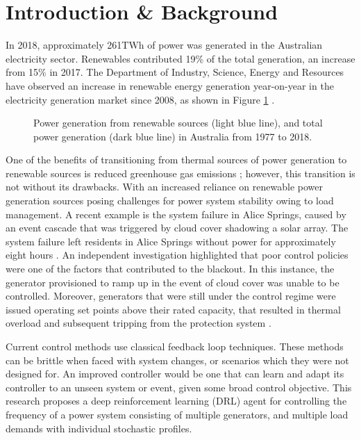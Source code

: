 \section{Introduction \& Background}
In 2018, approximately 261$\si{\tera\watt\hour}$ of power was generated in the Australian electricity sector. Renewables contributed 19\% of the total generation, an increase from 15\% in 2017. The Department of Industry, Science, Energy and Resources have observed an increase in renewable energy generation year-on-year in the electricity generation market since 2008, as shown in Figure \ref{fig:energyts} \cite{Diser2020}.
\begin{figure}[ht]
	\centering
	
	\caption{Power generation from renewable sources (light blue line), and total power generation (dark blue line) in Australia from 1977 to 2018.}
	\label{fig:energyts}
\end{figure}



One of the benefits of transitioning from thermal sources of power generation to renewable sources is reduced greenhouse gas emissions \cite{IPCC2012}; however, this transition is not without its drawbacks. With an increased reliance on renewable power generation sources posing challenges for power system stability owing to load management. A recent example is the system failure in Alice Springs, caused by an event cascade that was triggered by cloud cover shadowing a solar array. The system failure left residents in Alice Springs without power for approximately eight hours \cite{UCNT2019}. An independent investigation highlighted that poor control policies were one of the factors that contributed to the blackout. In this instance, the generator provisioned to ramp up in the event of cloud cover was unable to be controlled. Moreover, generators that were still under the control regime were issued operating set points above their rated capacity, that resulted in thermal overload and subsequent tripping from the protection system \cite{Wilkey2019}.

Current control methods use classical feedback loop techniques. These methods can be brittle when faced with system changes, or scenarios which they were not designed for. An improved controller would be one that can learn and adapt its controller to an unseen system or event, given some broad control objective. This research proposes a deep reinforcement learning (DRL) agent for controlling the frequency of a power system consisting of multiple generators, and multiple load demands with individual stochastic profiles.

